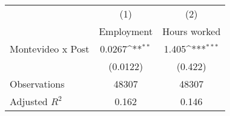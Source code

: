 {
\def\sym#1{\ifmmode^{#1}\else\(^{#1}\)\fi}
\begin{tabular}{l*{2}{c}}
\hline\hline
                &\multicolumn{1}{c}{(1)}&\multicolumn{1}{c}{(2)}\\
                &\multicolumn{1}{c}{Employment}&\multicolumn{1}{c}{Hours worked}\\
\hline
Montevideo x Post&   0.0267\sym{**} &    1.405\sym{***}\\
                & (0.0122)         &  (0.422)         \\
\hline
Observations    &    48307         &    48307         \\
Adjusted \(R^{2}\)&    0.162         &    0.146         \\
\hline\hline
\end{tabular}
}
